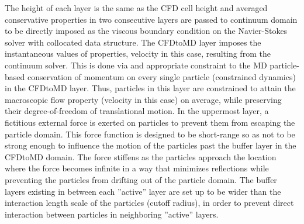 \documentclass[preprint,12pt]{elsarticle}
\newcommand{\skonote}[1]{ {\textcolor{green} { ***Jeff: #1 }}}
\newcommand{\skonote}[1]{}
\begin{document}
The height of each layer is the same as the CFD cell height and averaged conservative properties in two consecutive layers are passed to continuum domain to be directly imposed as the viscous boundary condition on the Navier-Stokes solver with collocated data structure. The CFDtoMD layer imposes the instantaneous values of properties, velocity in this case, resulting from the continuum solver. This is done via and appropriate constraint to the MD particle-based conservation of momentum on every single particle (constrained dynamics) in the CFDtoMD layer. Thus, particles in this layer are constrained to attain the macroscopic flow property (velocity in this case) on average, while preserving their degree-of-freedom of translational motion. In the uppermost layer, a fictitious external force is exerted on particles to prevent them from escaping the particle domain. This force function is designed to be short-range so as not to be strong enough to influence the motion of the particles past the buffer layer in the CFDtoMD domain. The force stiffens as the particles approach the location where the force becomes infinite in a way that minimizes reflections while preventing the particles from drifting out of the particle domain. The buffer layers existing in between each ''active'' layer are set up to be wider than the interaction length scale of the particles (cutoff radius), in order to prevent direct interaction between particles in neighboring ''active'' layers.

\end{document}
